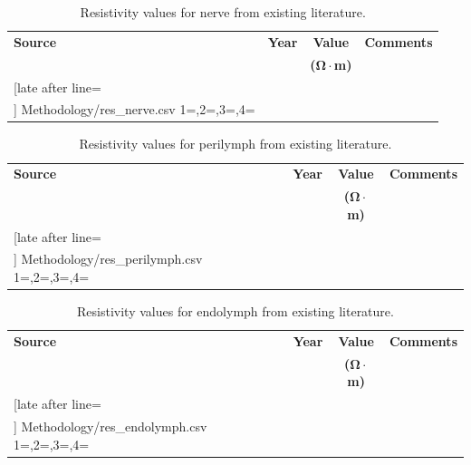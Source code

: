 \begin{table}
	\centering
	\sffamily
	\small
	\caption[Nerve resistivity values]{Resistivity values for nerve from
	existing literature.}
	\label{table:nerve_res}
	
	\begin{tabularx}{0.9\textwidth}{p{2.6cm} c c X}
		\toprule
		\textbf{Source}	& \textbf{Year}	& \textbf{Value} & \textbf{Comments} \\
			& 	& \textbf{($ \mathsf{\boldsymbol{\Omega}} \cdot $m)} & \\
		\midrule
		
		\csvreader[late after line=\\]%
			{Methodology/res_nerve.csv}%
			{1=\src,2=\year,3=\val,4=\comm}%
 			{\src & \year & \val & \comm}%
		\bottomrule
	\end{tabularx}
	
\end{table}

\begin{table}
	\centering
	\sffamily
	\small
	\caption[Perilymph resistivity values]{Resistivity values for perilymph
	from existing literature.}
	\label{table:perilymph_res}
	
	\begin{tabularx}{0.9\textwidth}{p{2.6cm} c c X}
		\toprule
		\textbf{Source}	& \textbf{Year}	& \textbf{Value} & \textbf{Comments} \\
			& 	& \textbf{($ \mathsf{\boldsymbol{\Omega}} \cdot $m)} & \\
		\midrule
		
		\csvreader[late after line=\\]%
			{Methodology/res_perilymph.csv}%
			{1=\src,2=\year,3=\val,4=\comm}%
 			{\src & \year & \val & \comm}%
		\bottomrule
	\end{tabularx}
	
\end{table}

\begin{table}
	\centering
	\sffamily
	\small
	\caption[Endolymph resistivity values]{Resistivity values for endolymph from
	existing literature.}
	\label{table:endolymph_res}
	
	\begin{tabularx}{0.9\textwidth}{p{2.6cm} c c X}
		\toprule
		\textbf{Source}	& \textbf{Year}	& \textbf{Value} & \textbf{Comments} \\
			& 	& \textbf{($ \mathsf{\boldsymbol{\Omega}} \cdot $m)} & \\
		\midrule
		
		\csvreader[late after line=\\]%
			{Methodology/res_endolymph.csv}%
			{1=\src,2=\year,3=\val,4=\comm}%
 			{\src & \year & \val & \comm}%
		\bottomrule
	\end{tabularx}
	
\end{table}

